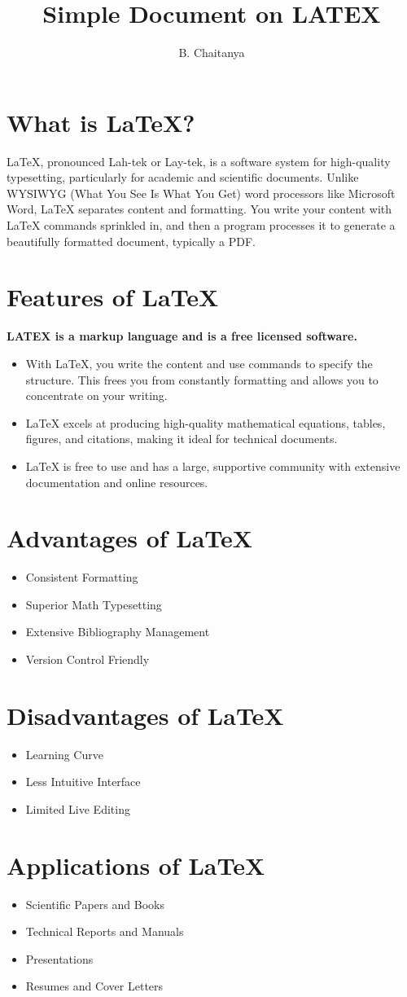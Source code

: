 \documentclass[12pt,a4paper]{article}
\title{Simple Document on LATEX}
\author{B. Chaitanya}
\begin{document}
\pagestyle{fancy}
\fancyhf{}
\fancyhead{}
\fancyfoot{}
\fancyfoot[R]{\thepage}
\section{What is LaTeX?}
LaTeX, pronounced Lah-tek or Lay-tek, is a software system for high-quality typesetting, particularly for academic and scientific documents. Unlike WYSIWYG (What You See Is What You Get) word processors like Microsoft Word, LaTeX separates content and formatting. You write your content with LaTeX commands sprinkled in, and then a program processes it to generate a beautifully formatted document, typically a PDF.
\section{Features of LaTeX}
\textbf{LATEX is a markup language and is a free licensed software.}
\begin{itemize}
	\item With LaTeX, you write the content and use commands to specify the structure. This frees you from constantly formatting and allows you to concentrate on your writing.	
	\item LaTeX excels at producing high-quality mathematical equations, tables, figures, and citations, making it ideal for technical documents.	
	\item LaTeX is free to use and has a large, supportive community with extensive documentation and online resources.
\end{itemize}

\section{Advantages of LaTeX}
\begin{itemize}
	\item Consistent Formatting
	\item Superior Math Typesetting
	\item Extensive Bibliography Management
	\item Version Control Friendly
\end{itemize}
\section{Disadvantages of LaTeX}
\begin{itemize}
	\item Learning Curve
	\item Less Intuitive Interface
	\item Limited Live Editing
\end{itemize}
\section{Applications of LaTeX}
\begin{itemize}
	\item Scientific Papers and Books
	\item Technical Reports and Manuals
	\item Presentations
	\item Resumes and Cover Letters
\end{itemize}
\end{document}

